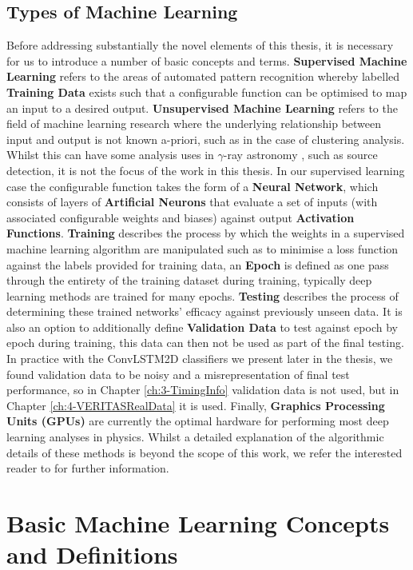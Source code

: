 \subsection{Types of Machine Learning}
Before addressing substantially the novel elements of this thesis, it is necessary for us to introduce a number of basic concepts and terms. \textbf{Supervised Machine Learning} refers to the areas of automated pattern recognition whereby labelled \textbf{Training Data} exists such that a configurable function can be optimised to map an input to a desired output. \textbf{Unsupervised Machine Learning} refers to the field of machine learning research where the underlying relationship between input and output is not known a-priori, such as in the case of clustering analysis. Whilst this can have some analysis uses in $\gamma$-ray astronomy \cite{tomthesis}, such as source detection, it is not the focus of the work in this thesis. In our supervised learning case the configurable function takes the form of a \textbf{Neural Network}, which consists of layers of \textbf{Artificial Neurons} that evaluate a set of inputs (with associated configurable weights and biases) against output \textbf{Activation Functions}. \textbf{Training} describes the process by which the weights in a supervised machine learning algorithm are manipulated such as to minimise a loss function against the labels provided for training data, an \textbf{Epoch} is defined as one pass through the entirety of the training dataset during training, typically deep learning methods are trained for many epochs. \textbf{Testing} describes the process of determining these trained networks' efficacy against previously unseen data. It is also an option to additionally define \textbf{Validation Data} to test against epoch by epoch during training, this data can then not be used as part of the final testing. In practice with the ConvLSTM2D classifiers we present later in the thesis, we found validation data to be noisy and a misrepresentation of final test performance, so in Chapter \ref{ch:3-TimingInfo} validation data is not used, but in Chapter \ref{ch:4-VERITASRealData} it is used. Finally, \textbf{Graphics Processing Units (GPUs)} are currently the optimal hardware for performing most deep learning analyses in physics. Whilst a detailed explanation of the algorithmic details of these methods is beyond the scope of this work, we refer the interested reader to \cite{goodfellow2016deep,erdmannwhite,dcnn} for further information.

\section{Basic Machine Learning Concepts and Definitions}

